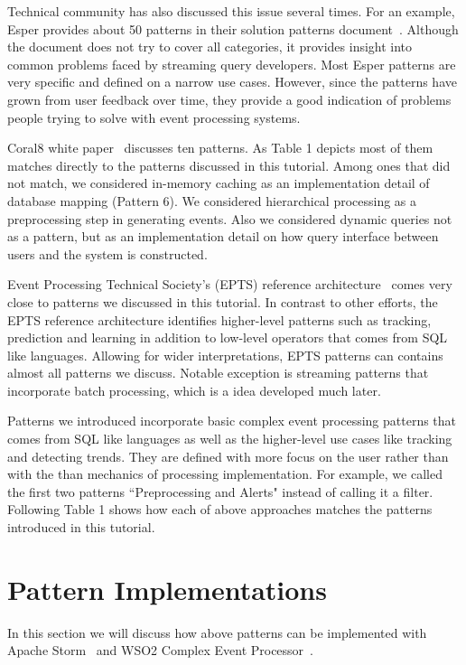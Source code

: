 \documentclass{sig-alternate}
\begin{document}
{Technical community has also discussed this issue several times. For an example, Esper provides about 50 patterns in their solution patterns document~\cite{esperPatterns}. Although the document does not try to cover all categories, it provides insight into common problems faced by streaming query developers. Most Esper patterns are very specific and defined on a narrow use cases. However, since the patterns have grown from user feedback over time, they provide a good indication of problems people trying to solve with event processing systems. 

Coral8 white paper~\cite{Coral810patterns} discusses ten patterns. As Table 1 depicts most of them matches directly to the patterns discussed in this tutorial. Among ones that did not match, we considered in-memory caching as an implementation detail of database mapping (Pattern 6). We considered hierarchical processing as a preprocessing step in generating events. Also we considered dynamic queries not as a pattern, but as an implementation detail on how query interface between users and the system is constructed. 

Event Processing Technical Society's (EPTS) reference architecture~\cite{eptsRefArch} comes very close to patterns we discussed in this tutorial. In contrast to other efforts, the EPTS reference architecture identifies higher-level patterns such as tracking, prediction and learning in addition to low-level operators that comes from SQL like languages. Allowing for wider interpretations, EPTS patterns can contains almost all patterns we discuss. Notable exception is streaming patterns that incorporate batch processing, which is a idea developed much later. 

Patterns we introduced incorporate basic complex event processing patterns that comes from SQL like languages as well as the higher-level use cases like tracking and detecting trends.  They are defined with more focus on the user rather than with the than mechanics of processing implementation. For example, we called the first two patterns ``Preprocessing and Alerts" instead of calling it a filter. Following Table 1 shows how each of above approaches matches the patterns introduced in this tutorial. 

\section{Pattern Implementations}  

In this section we will discuss how above patterns can be implemented with Apache Storm~\cite{storm} and WSO2 Complex Event Processor~\cite{siddhi}. 

}
\end{document}
